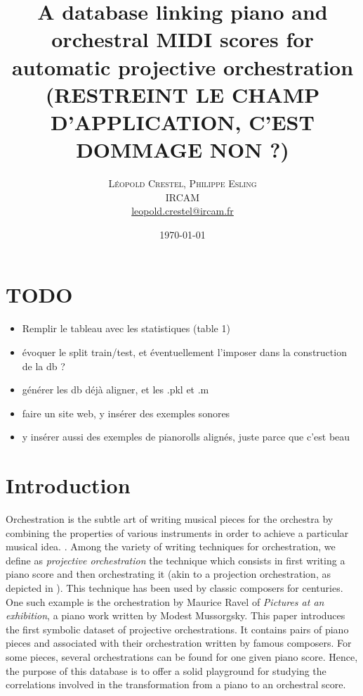 \documentclass[twoside,twocolumn]{article}
\title{A database linking piano and orchestral MIDI scores for automatic projective orchestration \textbf{(RESTREINT LE CHAMP D'APPLICATION, C'EST DOMMAGE NON ?)}} %
\author{%
\textsc{L\'eopold Crestel, Philippe Esling}\\[1ex] %
\normalsize IRCAM \\ %
\normalsize \href{mailto:leopold.crestel@ircam.fr}{leopold.crestel@ircam.fr} %
}
\date{\today} %
\begin{document}
\maketitle


\section{TODO}
\begin{itemize}
\item Remplir le tableau avec les statistiques (table 1)
\item évoquer le split train/test, et éventuellement l'imposer dans la construction de la db ?
\item générer les db déjà aligner,  et les .pkl et .m
\item faire un site web, y insérer des exemples sonores
\item y insérer aussi des exemples de pianorolls alignés, juste parce que c'est beau
\end{itemize}

\section{Introduction}
Orchestration is the subtle art of writing musical pieces for the orchestra by combining the properties of various instruments in order to achieve a particular musical idea. \cite{koechli_orch,Rimsky-Korsakov:1873aa}. 
Among the variety of writing techniques for orchestration, we define as \textit{projective orchestration} \cite{esling2010dynamic} the technique which consists in first writing a piano score and then orchestrating it (akin to a projection orchestration, as depicted in ). 
This technique has been used by classic composers for centuries. One such example is the orchestration by Maurice Ravel of \textit{Pictures at an exhibition}, a piano work written by Modest Mussorgsky.
This paper introduces the first symbolic dataset of projective orchestrations.
It contains pairs of piano pieces and associated with their orchestration written by famous composers. For some pieces, several orchestrations can be found for one given piano score.
Hence, the purpose of this database is to offer a solid playground for studying the correlations involved in the transformation from a piano to an orchestral score.
\end{document}
